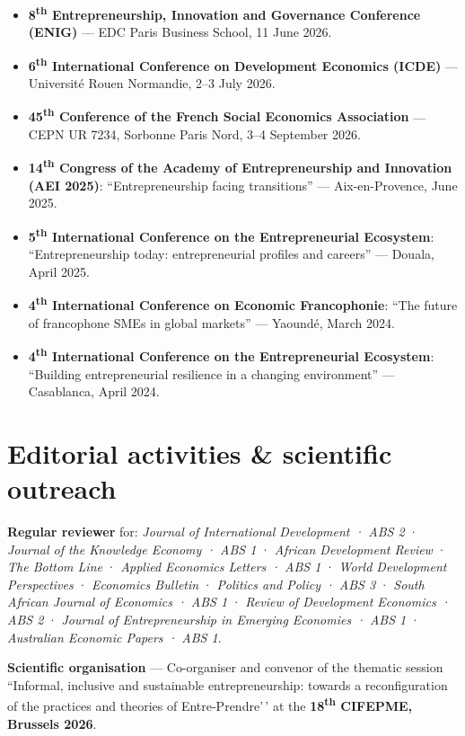 \documentclass[
  french,
  10pt,
  letterpaper,
  DIV=11,
  numbers=noendperiod]{scrartcl}
\begin{document}
\begin{itemize}[itemsep=2pt]
\item \textbf{8\textsuperscript{th} Entrepreneurship, Innovation and Governance Conference (ENIG)} — EDC Paris Business School, 11 June 2026.
\item \textbf{6\textsuperscript{th} International Conference on Development Economics (ICDE)} — Université Rouen Normandie, 2–3 July 2026.
\item \textbf{45\textsuperscript{th} Conference of the French Social Economics Association} — CEPN UR 7234, Sorbonne Paris Nord, 3–4 September 2026.
\item \textbf{14\textsuperscript{th} Congress of the Academy of Entrepreneurship and Innovation (AEI 2025)}: ``Entrepreneurship facing transitions'' — Aix-en-Provence, June 2025.
\item \textbf{5\textsuperscript{th} International Conference on the Entrepreneurial Ecosystem}: ``Entrepreneurship today: entrepreneurial profiles and careers'' — Douala, April 2025.
\item \textbf{4\textsuperscript{th} International Conference on Economic Francophonie}: ``The future of francophone SMEs in global markets'' — Yaoundé, March 2024.
\item \textbf{4\textsuperscript{th} International Conference on the Entrepreneurial Ecosystem}: ``Building entrepreneurial resilience in a changing environment'' — Casablanca, April 2024.
\end{itemize}

\section{Editorial activities \& scientific
outreach}\label{editorial-activities-scientific-outreach}

\textbf{Regular reviewer} for:
\textit{Journal of International Development · ABS 2} ·
\textit{Journal of the Knowledge Economy · ABS 1} ·
\textit{African Development Review} · \textit{The Bottom Line} ·
\textit{Applied Economics Letters · ABS 1} ·
\textit{World Development Perspectives} · \textit{Economics Bulletin} ·
\textit{Politics and Policy · ABS 3} ·
\textit{South African Journal of Economics · ABS 1} ·
\textit{Review of Development Economics · ABS 2} ·
\textit{Journal of Entrepreneurship in Emerging Economies · ABS 1} ·
\textit{Australian Economic Papers · ABS 1}.

\textbf{Scientific organisation} --- Co-organiser and convenor of the
thematic session ``Informal, inclusive and sustainable entrepreneurship:
towards a reconfiguration of the practices and theories of
Entre-Prendre'\,' at the
\textbf{18\textsuperscript{th} CIFEPME, Brussels 2026}.
\end{document}

